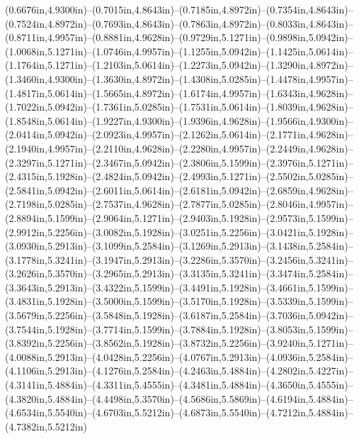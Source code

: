(0.6676in,4.9300in)--(0.7015in,4.8643in)--(0.7185in,4.8972in)--(0.7354in,4.8643in)--(0.7524in,4.8972in)--(0.7693in,4.8643in)--(0.7863in,4.8972in)--(0.8033in,4.8643in)--(0.8711in,4.9957in)--(0.8881in,4.9628in)--(0.9729in,5.1271in)--(0.9898in,5.0942in)--(1.0068in,5.1271in)--(1.0746in,4.9957in)--(1.1255in,5.0942in)--(1.1425in,5.0614in)--(1.1764in,5.1271in)--(1.2103in,5.0614in)--(1.2273in,5.0942in)--(1.3290in,4.8972in)--(1.3460in,4.9300in)--(1.3630in,4.8972in)--(1.4308in,5.0285in)--(1.4478in,4.9957in)--(1.4817in,5.0614in)--(1.5665in,4.8972in)--(1.6174in,4.9957in)--(1.6343in,4.9628in)--(1.7022in,5.0942in)--(1.7361in,5.0285in)--(1.7531in,5.0614in)--(1.8039in,4.9628in)--(1.8548in,5.0614in)--(1.9227in,4.9300in)--(1.9396in,4.9628in)--(1.9566in,4.9300in)--(2.0414in,5.0942in)--(2.0923in,4.9957in)--(2.1262in,5.0614in)--(2.1771in,4.9628in)--(2.1940in,4.9957in)--(2.2110in,4.9628in)--(2.2280in,4.9957in)--(2.2449in,4.9628in)--(2.3297in,5.1271in)--(2.3467in,5.0942in)--(2.3806in,5.1599in)--(2.3976in,5.1271in)--(2.4315in,5.1928in)--(2.4824in,5.0942in)--(2.4993in,5.1271in)--(2.5502in,5.0285in)--(2.5841in,5.0942in)--(2.6011in,5.0614in)--(2.6181in,5.0942in)--(2.6859in,4.9628in)--(2.7198in,5.0285in)--(2.7537in,4.9628in)--(2.7877in,5.0285in)--(2.8046in,4.9957in)--(2.8894in,5.1599in)--(2.9064in,5.1271in)--(2.9403in,5.1928in)--(2.9573in,5.1599in)--(2.9912in,5.2256in)--(3.0082in,5.1928in)--(3.0251in,5.2256in)--(3.0421in,5.1928in)--(3.0930in,5.2913in)--(3.1099in,5.2584in)--(3.1269in,5.2913in)--(3.1438in,5.2584in)--(3.1778in,5.3241in)--(3.1947in,5.2913in)--(3.2286in,5.3570in)--(3.2456in,5.3241in)--(3.2626in,5.3570in)--(3.2965in,5.2913in)--(3.3135in,5.3241in)--(3.3474in,5.2584in)--(3.3643in,5.2913in)--(3.4322in,5.1599in)--(3.4491in,5.1928in)--(3.4661in,5.1599in)--(3.4831in,5.1928in)--(3.5000in,5.1599in)--(3.5170in,5.1928in)--(3.5339in,5.1599in)--(3.5679in,5.2256in)--(3.5848in,5.1928in)--(3.6187in,5.2584in)--(3.7036in,5.0942in)--(3.7544in,5.1928in)--(3.7714in,5.1599in)--(3.7884in,5.1928in)--(3.8053in,5.1599in)--(3.8392in,5.2256in)--(3.8562in,5.1928in)--(3.8732in,5.2256in)--(3.9240in,5.1271in)--(4.0088in,5.2913in)--(4.0428in,5.2256in)--(4.0767in,5.2913in)--(4.0936in,5.2584in)--(4.1106in,5.2913in)--(4.1276in,5.2584in)--(4.2463in,5.4884in)--(4.2802in,5.4227in)--(4.3141in,5.4884in)--(4.3311in,5.4555in)--(4.3481in,5.4884in)--(4.3650in,5.4555in)--(4.3820in,5.4884in)--(4.4498in,5.3570in)--(4.5686in,5.5869in)--(4.6194in,5.4884in)--(4.6534in,5.5540in)--(4.6703in,5.5212in)--(4.6873in,5.5540in)--(4.7212in,5.4884in)--(4.7382in,5.5212in) 